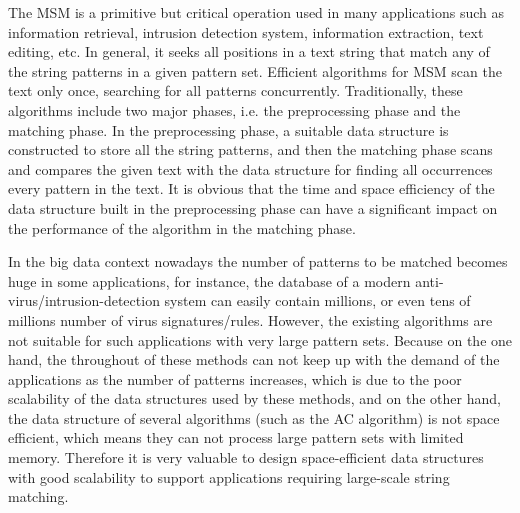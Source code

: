 \documentclass{article}
\begin{document}
The MSM is a primitive but critical operation used in many
applications such as information retrieval, intrusion detection
system, information extraction, text editing, etc. In general, it
seeks all positions in a text string that match any of the string
patterns in a given pattern set. Efficient algorithms for MSM scan the
text only once, searching for all patterns
concurrently. Traditionally, these algorithms include two major
phases, i.e. the \textsf{preprocessing phase} and the \textsf{matching
  phase}. In the \textsf{preprocessing phase}, a suitable data
structure is constructed to store all the string patterns, and then
the \textsf{matching phase} scans and compares the given text with the
data structure for finding all occurrences every pattern in the
text. It is obvious that the time and space efficiency of the data
structure built in the preprocessing phase can have a significant
impact on the performance of the algorithm in the matching phase.

 
In the big data context nowadays the number of patterns to be matched
becomes huge in some applications, for instance, the database of a
modern anti-virus/intrusion-detection system can easily contain
millions, or even tens of millions number of virus
signatures/rules. However, the existing algorithms are not suitable
for such applications with very large pattern sets. Because on the one
hand, the throughout of these methods can not keep up with the demand
of the applications as the number of patterns increases, which is due
to the poor scalability of the data structures used by these methods,
and on the other hand, the data structure of several algorithms (such
as the \textsf{AC} algorithm) is not space efficient, which means they
can not process large pattern sets with limited memory. Therefore it
is very valuable to design space-efficient data structures with good
scalability to support applications requiring large-scale string
matching.
\end{document}
